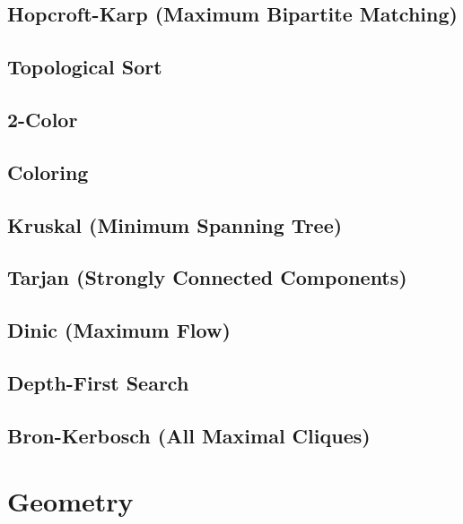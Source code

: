 \documentclass{article}
\begin{document}
	\newpage
	\subsection{Hopcroft-Karp (Maximum Bipartite Matching)}
	

	\subsection{Topological Sort}
	

	\newpage
	\subsection{2-Color}
	

	\newpage
	\subsection{Coloring}
	

	\newpage
	\subsection{Kruskal (Minimum Spanning Tree)}
	

	\newpage
	\subsection{Tarjan (Strongly Connected Components)}
	

	\newpage
	\subsection{Dinic (Maximum Flow)}
	

	\subsection{Depth-First Search}
	

	\newpage
    \subsection{Bron-Kerbosch (All Maximal Cliques)}
    

	\newpage
\section{Geometry}
\end{document}
